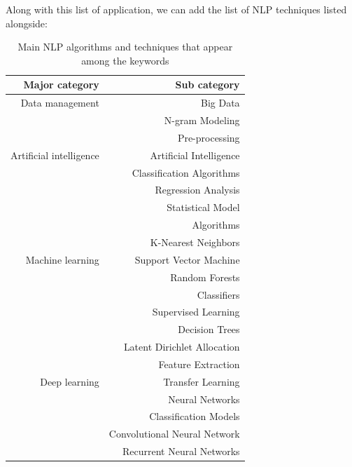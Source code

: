 Along with this list of application, we can add the list of NLP techniques listed alongside:
\begin{table}[bp]
    \centering
    \begin{tabular}{rr}
        Major category          & Sub category                 \\ [0.5ex]
        \toprule
        Data management         & Big Data                     \\
                                & N-gram Modeling              \\
                                & Pre-processing               \\
        Artificial intelligence & Artificial Intelligence      \\
                                & Classification Algorithms    \\
                                & Regression Analysis          \\
                                & Statistical Model            \\
                                & Algorithms                   \\
                                & K-Nearest Neighbors          \\
        Machine learning        & Support Vector Machine       \\
                                & Random Forests               \\
                                & Classifiers                  \\
                                & Supervised Learning          \\
                                & Decision Trees               \\
                                & Latent Dirichlet Allocation  \\
                                & Feature Extraction           \\
        Deep learning           & Transfer Learning            \\
                                & Neural Networks              \\
                                & Classification Models        \\
                                & Convolutional Neural Network \\
                                & Recurrent Neural Networks    \\
        \bottomrule
    \end{tabular}
    \caption{Main NLP algorithms and techniques that appear among the keywords}
    \label{table:nlp-tools}
\end{table}


